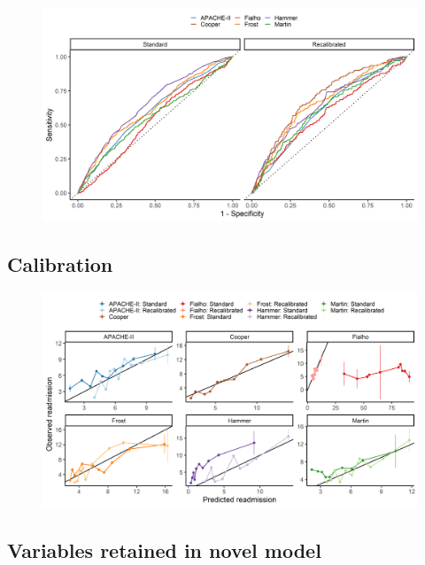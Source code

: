 \documentclass[onecolumn]{article}
\begin{document}

\begin{figure}
\centering
	\includegraphics[width=\textwidth]{discrimination.png}
	\caption{}
	\label{Discrimination}
\end{figure}


\subsection{Calibration}


\begin{figure}
\centering
	\includegraphics[width=\textwidth]{calibration.png}
	\caption{}
	\label{Discrimination}
\end{figure}

\subsection{Variables retained in novel model}
\end{document}
